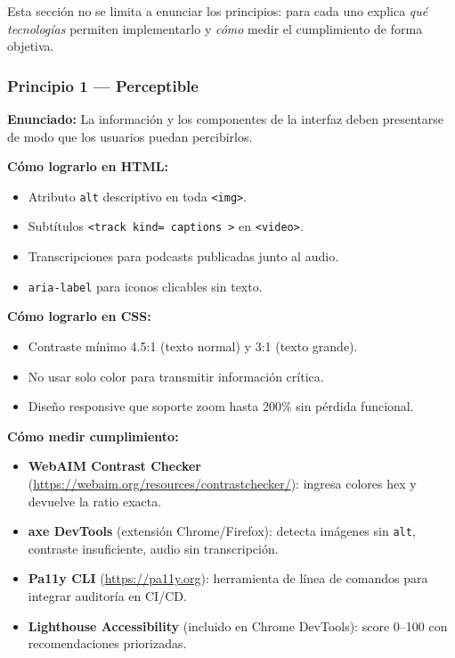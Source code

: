 Esta sección no se limita a enunciar los principios: para cada uno
explica \emph{qué tecnologías} permiten implementarlo y \emph{cómo}
medir el cumplimiento de forma objetiva.

\subsubsection{Principio 1 --- Perceptible}

\textbf{Enunciado:} La información y los componentes de la interfaz
deben presentarse de modo que los usuarios puedan percibirlos.

\textbf{Cómo lograrlo en HTML:}
\begin{itemize}
\item Atributo \texttt{alt} descriptivo en toda \texttt{<img>}.
\item Subtítulos \texttt{<track kind= captions >} en \texttt{<video>}.
\item Transcripciones para podcasts publicadas junto al audio.
\item \texttt{aria-label} para iconos clicables sin texto.
\end{itemize}

\textbf{Cómo lograrlo en CSS:}
\begin{itemize}
\item Contraste mínimo 4.5:1 (texto normal) y 3:1 (texto grande).
\item No usar solo color para transmitir información crítica.
\item Diseño responsive que soporte zoom hasta 200\% sin pérdida
funcional.
\end{itemize}

\textbf{Cómo medir cumplimiento:}
\begin{itemize}
\item \textbf{WebAIM Contrast Checker} (\url{https://webaim.org/resources/contrastchecker/}):
ingresa colores hex y devuelve la ratio exacta.
\item \textbf{axe DevTools} (extensión Chrome/Firefox): detecta
imágenes sin \texttt{alt}, contraste insuficiente, audio sin
transcripción.
\item \textbf{Pa11y CLI} (\url{https://pa11y.org}): herramienta de
línea de comandos para integrar auditoría en CI/CD.
\item \textbf{Lighthouse Accessibility} (incluido en Chrome
DevTools): score 0--100 con recomendaciones priorizadas.
\end{itemize}

